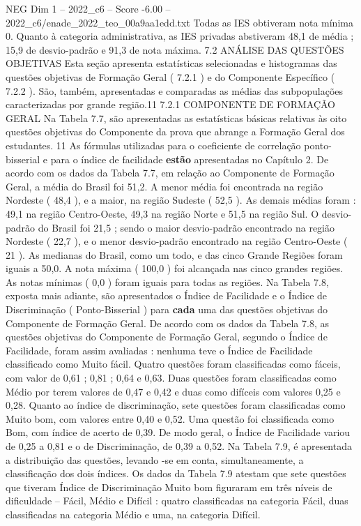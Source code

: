 \begin{textsample}{NEG Dim 1 – 2022\_c6 – Score -6.00 – 2022\_c6/enade\_2022\_teo\_00a9aa1edd.txt}
Todas as IES obtiveram nota mínima 0.
Quanto à categoria administrativa, as IES privadas abstiveram 48,1 de média ; 15,9 de desvio-padrão e 91,3 de nota máxima. 7.2 ANÁLISE DAS QUESTÕES OBJETIVAS Esta seção apresenta estatísticas selecionadas e histogramas das questões objetivas de Formação Geral ( 7.2.1 ) e do Componente Específico ( 7.2.2 ).
São, também, apresentadas e comparadas as médias das subpopulações caracterizadas por grande região.11 7.2.1 COMPONENTE DE FORMAÇÃO GERAL Na Tabela 7.7, são apresentadas as estatísticas básicas relativas às oito questões objetivas do Componente da prova que abrange a Formação Geral dos estudantes. 11 As fórmulas utilizadas para o coeficiente de correlação ponto-bisserial e para o índice de facilidade \textbf{estão} apresentadas no Capítulo 2.
De acordo com os dados da Tabela 7.7, em relação ao Componente de Formação Geral, a média do Brasil foi 51,2.
A menor média foi encontrada na região Nordeste ( 48,4 ), e a maior, na região Sudeste ( 52,5 ).
As demais médias foram : 49,1 na região Centro-Oeste, 49,3 na região Norte e 51,5 na região Sul.
O desvio-padrão do Brasil foi 21,5 ; sendo o maior desvio-padrão encontrado na região Nordeste ( 22,7 ), e o menor desvio-padrão encontrado na região Centro-Oeste ( 21 ).
As medianas do Brasil, como um todo, e das cinco Grande Regiões foram iguais a 50,0.
A nota máxima ( 100,0 ) foi alcançada nas cinco grandes regiões.
As notas mínimas ( 0,0 ) foram iguais para todas as regiões.
Na Tabela 7.8, exposta mais adiante, são apresentados o Índice de Facilidade e o Índice de Discriminação ( Ponto-Bisserial ) para \textbf{cada} uma das questões objetivas do Componente de Formação Geral.
De acordo com os dados da Tabela 7.8, as questões objetivas do Componente de Formação Geral, segundo o Índice de Facilidade, foram assim avaliadas : nenhuma teve o Índice de Facilidade classificado como Muito fácil.
Quatro questões foram classificadas como fáceis, com valor de 0,61 ; 0,81 ; 0,64 e 0,63.
Duas questões foram classificadas como Médio por terem valores de 0,47 e 0,42 e duas como difíceis com valores 0,25 e 0,28.
Quanto ao índice de discriminação, sete questões foram classificadas como Muito bom, com valores entre 0,40 e 0,52.
Uma questão foi classificada como Bom, com índice de acerto de 0,39.
De modo geral, o Índice de Facilidade variou de 0,25 a 0,81 e o de Discriminação, de 0,39 a 0,52.
Na Tabela 7.9, é apresentada a distribuição das questões, levando -se em conta, simultaneamente, a classificação dos dois índices.
Os dados da Tabela 7.9 atestam que sete questões que tiveram Índice de Discriminação Muito bom figuraram em três níveis de dificuldade – Fácil, Médio e Difícil : quatro classificadas na categoria Fácil, duas classificadas na categoria Médio e uma, na categoria Difícil.

\end{textsample}
